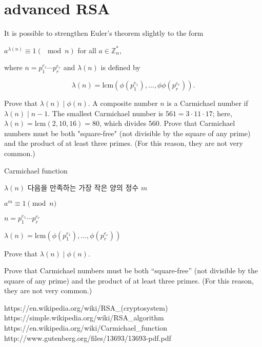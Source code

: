 \section{advanced RSA}

It is possible to strengthen Euler's theorem slightly to the form

$a^{\lambda(n)} \equiv 1 (\mod n)$ for all $a \in \mathbb Z_n^*$,

where $n = p_1^{e_1} \cdots p_r^{e_r}$ and $\lambda(n)$ is defined by

$$\lambda(n) = \text{lcm}(\phi(p_1^{e_1}), \ldots, \phi\phi(p_r^{e_r})). $$

Prove that $\lambda(n) \mid \phi(n)$. A composite number $n$ is a Carmichael number if $\lambda(n) \mid n - 1$. The smallest Carmichael number is $561 = 3 \cdot 11 \cdot 17$; here, $\lambda(n) = \text{lcm}(2, 10, 16) = 80$, which divides $560$. Prove that Carmichael numbers must be both "square-free" (not divisible by the square of any prime) and the product of at least three primes. (For this reason, they are not very common.)


Carmichael function


$\lambda(n)$ 다음을 만족하는 가장 작은 양의 정수 $m$

$a^m \equiv 1 \pmod{n}$

$n = p_1^{e_1} \cdots p_r^{e_r}$

$\lambda(n) = \text{lcm}(\phi(p_1^{e_1}), \ldots,\phi(p_r^{e_r}))$


Prove that $\lambda(n) \mid \phi(n)$.


Prove that Carmichael numbers must be both “square-free” (not divisible by the square of any prime) and the
product of at least three primes. (For this reason, they are not very common.)



https://en.wikipedia.org/wiki/RSA_(cryptosystem)
https://simple.wikipedia.org/wiki/RSA_algorithm
https://en.wikipedia.org/wiki/Carmichael_function
http://www.gutenberg.org/files/13693/13693-pdf.pdf

